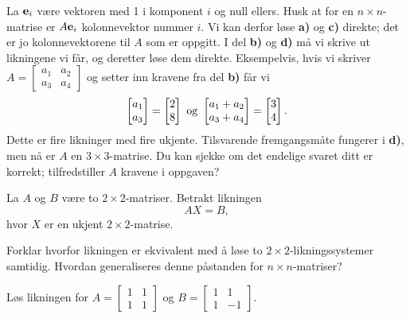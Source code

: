 



\begin{losning}
La $\mathbf{e}_i$ være vektoren med 1 i komponent $i$ og null ellers. Husk at for en $n\times n$-matrise er $A\mathbf{e}_i$ kolonnevektor nummer $i$. Vi kan derfor løse \textbf{a)} og \textbf{c)} direkte; det er jo kolonnevektorene til $A$ som er oppgitt. I del \textbf{b)} og \textbf{d)} må vi skrive ut likningene vi får, og deretter løse dem direkte. Eksempelvis, hvis vi skriver $A=\begin{bmatrix}
a_1 & a_2\\
a_3 & a_4
\end{bmatrix}
$ og setter inn kravene fra del \textbf{b)} får vi $$\begin{bmatrix} a_1 \\ a_3 \end{bmatrix}=\begin{bmatrix} 2 \\ 8 \end{bmatrix} \text{ og } \begin{bmatrix} a_1+a_2 \\ a_3+a_4 \end{bmatrix}=\begin{bmatrix} 3 \\ 4 \end{bmatrix}.$$ Dette er fire likninger med fire ukjente. Tilsvarende fremgangsmåte fungerer i \textbf{d)}, men nå er $A$ en $3\times 3$-matrise. Du kan sjekke om det endelige svaret ditt er korrekt; tilfredstiller $A$ kravene i oppgaven?
\end{losning}




\begin{oppgave}
La $A$ og $B$ være to $2\times 2$-matriser. Betrakt likningen $$AX=B,$$ hvor $X$ er en ukjent $2\times 2$-matrise.

\begin{punkt}
Forklar hvorfor likningen er ekvivalent med å løse to $2\times 2$-likningssystemer samtidig. Hvordan generaliseres denne påstanden for $n\times n$-matriser?
\end{punkt}

\begin{punkt}
Løs likningen for $A=\begin{bmatrix}
1 & 1\\
1 & 1
\end{bmatrix}
$ og $B=\begin{bmatrix}
1 & 1\\
1 & -1
\end{bmatrix}.$
\end{punkt}


\end{oppgave}


